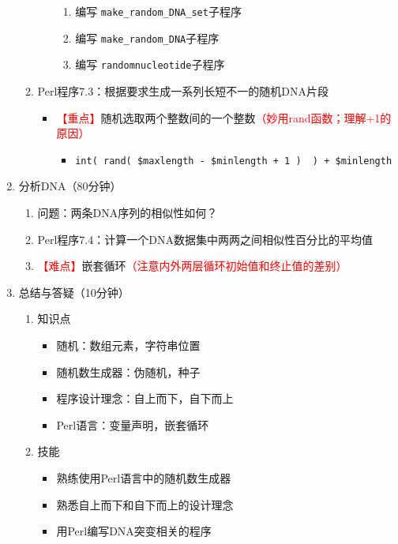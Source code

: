 \documentclass{TIJMUjiaoanLL}
\begin{document}
\begin{enumerate}
\begin{enumerate}
\begin{itemize}
\begin{enumerate}
	      \item 编写 \verb|make_random_DNA_set|子程序
	      \item 编写 \verb|make_random_DNA|子程序
	      \item 编写 \verb|randomnucleotide|子程序
	    \end{enumerate}
	\end{itemize}
      \item Perl程序7.3：根据要求生成一系列长短不一的随机DNA片段
	\begin{itemize}
	  \item \textcolor{red}{【重点】}随机选取两个整数间的一个整数\textcolor{red}{（妙用rand函数；理解+1的原因）}
	    \begin{itemize}
	      \item \verb|int( rand( $maxlength - $minlength + 1 )  ) + $minlength|
	    \end{itemize}
	\end{itemize}
    \end{enumerate}
  \item 分析DNA（80分钟）
    \begin{enumerate}
      \item 问题：两条DNA序列的相似性如何？
      \item Perl程序7.4：计算一个DNA数据集中两两之间相似性百分比的平均值
      \item \textcolor{red}{【难点】}嵌套循环\textcolor{red}{（注意内外两层循环初始值和终止值的差别）}
    \end{enumerate}
  \item 总结与答疑（10分钟）
    \begin{enumerate}
      \item 知识点
	\begin{itemize}
	  \item 随机：数组元素，字符串位置
	  \item 随机数生成器：伪随机，种子
	  \item 程序设计理念：自上而下，自下而上
	  \item Perl语言：变量声明，嵌套循环
	\end{itemize}
      \item 技能
	\begin{itemize}
	  \item 熟练使用Perl语言中的随机数生成器
	  \item 熟悉自上而下和自下而上的设计理念
	  \item 用Perl编写DNA突变相关的程序
	\end{itemize}
    \end{enumerate}
\end{enumerate}

\otherTail

\end{document}

